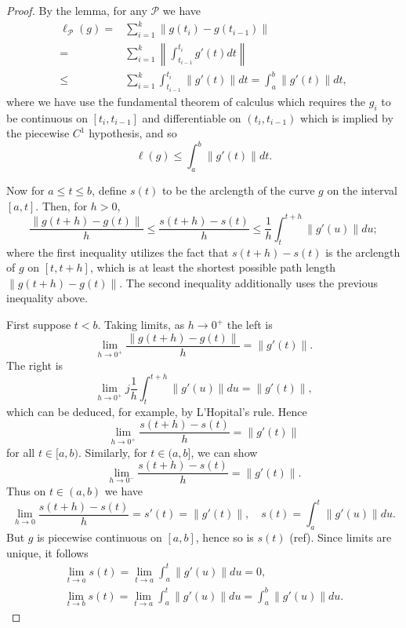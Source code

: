 \documentclass[12pt]{article}
\begin{document}
\begin{proof} 
	By the lemma, for any $\mathcal{P}$ we have 
	\begin{align*}
		\ell_\mathcal{P}(g) 
		=& \sum_{i=1}^k \|g(t_i)-g(t_{i-1})\| \\
		=& \sum_{i=1}^k \left\|\int_{t_{i-1}}^{t_i}g'(t)dt\right\| \\
		\leq& \sum_{i=1}^k \int_{t_{i-1}}^{t_i} \|g'(t)\|dt = \int_a^b \|g'(t)\|dt,
	\end{align*}
	where we have use the fundamental theorem of calculus which requires the $g_i$ to be continuous on $[t_i,t_{i-1}]$ and differentiable on $(t_i,t_{i-1})$ which is implied by the piecewise $C^1$ hypothesis, and so 
	\begin{equation*}
		\ell(g) \leq \int_a^b\|g'(t)\|dt.
	\end{equation*}

	Now for $a\leq t\leq b$, define $s(t)$ to be the arclength of the curve $g$ on the interval $[a,t]$. Then, for $h>0$,
	\begin{equation*}
		\frac{\|g(t+h)-g(t)\|}{h} \leq \frac{s(t+h)-s(t)}{h} \leq \frac{1}{h} \int_{t}^{t+h}\|g'(u)\|du;
	\end{equation*}
	where the first inequality utilizes the fact that $s(t+h)-s(t)$ is the arclength of $g$ on $[t,t+h]$, which is at least the shortest possible path length $\|g(t+h)-g(t)\|$. The second inequality additionally uses the previous inequality above. 

	First suppose $t<b$. Taking limits, as $h\to 0^+$ the left is 
	\begin{equation*}
		\lim_{h\to 0^+}\frac{\|g(t+h)-g(t)\|}{h} = \|g'(t)\|.
	\end{equation*}
	The right is 
	\begin{equation*}
		\lim_{h\to 0^+}j\frac{1}{h}\int_t^{t+h}\|g'(u)\|du = \|g'(t)\|,
	\end{equation*}
	which can be deduced, for example, by L'Hopital's rule. Hence 
	\begin{equation*}
		\lim_{h\to 0^+} \frac{s(t+h)-s(t)}{h} = \|g'(t)\|
	\end{equation*}
	for all $t\in [a,b)$. Similarly, for $t\in (a,b]$, we can show 
	\begin{equation*}
		\lim_{h\to 0^-} \frac{s(t+h)-s(t)}{h} = \|g'(t)\|.
	\end{equation*}
	Thus on $t\in (a,b)$ we have 
	\begin{equation*}
		\lim_{h\to 0}\frac{s(t+h)-s(t)}{h}=s'(t)=\|g'(t)\|, \quad s(t)=\int_a^t \|g'(u)\|du.
	\end{equation*}
	But $g$ is piecewise continuous on $[a,b]$, hence so is $s(t)$ (ref). Since limits are unique, it follows 
	\begin{gather*}
		\lim_{t\to a}s(t) = \lim_{t\to a}\int_a^t \|g'(u)\|du = 0, \\
		\lim_{t\to b}s(t) = \lim_{t\to a}\int_a^t \|g'(u)\|du = \int_a^b\|g'(u)\|du.
	\end{gather*}
\end{proof}	
\end{document}
